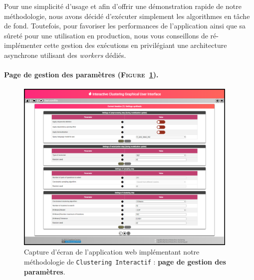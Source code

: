 			\begin{leftBarWarning}
				Pour une simplicité d'usage et afin d'offrir une démonstration rapide de notre méthodologie, nous avons décidé d'exécuter simplement les algorithmes en tâche de fond.
				Toutefois, pour favoriser les performances de l'application ainsi que sa sûreté pour une utilisation en production, nous vous conseillons de ré-implémenter cette gestion des exécutions en privilégiant une architecture asynchrone utilisant des \textit{workers} dédiés.
			\end{leftBarWarning}
		
		
		\paragraph{Page de gestion des paramètres (\textsc{Figure~\ref{figure:C-WEB-APPLICATION-PARAMETRAGE}}).}
		
			\begin{figure}[H]
				\centering
				\includegraphics[width=0.95\textwidth]{figures/interactive-clustering-application-parametres}
				\caption{
					Capture d'écran de l'application web implémentant notre méthodologie de \texttt{Clustering Interactif} : \textbf{page de gestion des paramètres}.
				}
				\label{figure:C-WEB-APPLICATION-PARAMETRAGE}
			\end{figure}
			
